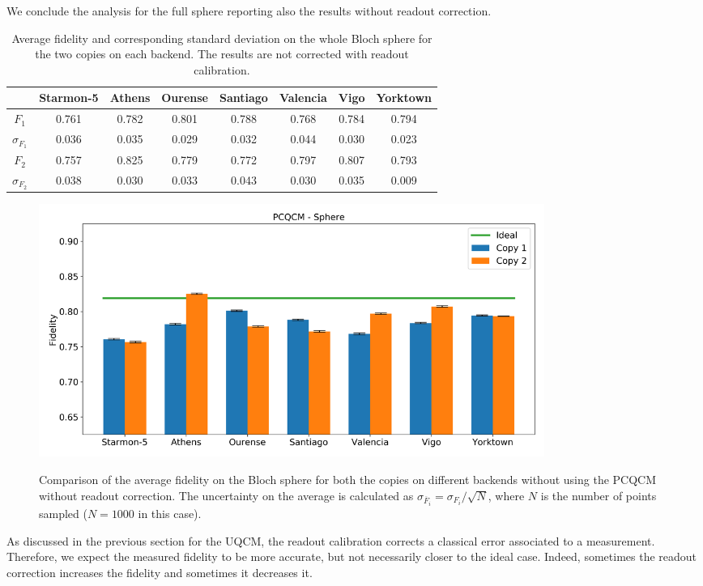 We conclude the analysis for the full sphere reporting also the results without readout correction.
\begin{table}[H]
    \centering
    \begin{tabular}{|c|c|c|c|c|c|c|c|}
    \hline
    \textbf{} & \textbf{Starmon-5} & \textbf{Athens} & \textbf{Ourense} & \textbf{Santiago} & \textbf{Valencia} & \textbf{Vigo} & \textbf{Yorktown} \\ \hline
    $F_1$              & 0.761 & 0.782 & 0.801 & 0.788 & 0.768 & 0.784 & 0.794 \\ \hline
    $\sigma_{F_1}$     & 0.036 & 0.035 & 0.029 & 0.032 & 0.044 & 0.030 & 0.023 \\ \hline
    $F_2$              & 0.757 & 0.825 & 0.779 & 0.772 & 0.797 & 0.807 & 0.793 \\ \hline
    $\sigma_{F_2}$     & 0.038 & 0.030 & 0.033 & 0.043 & 0.030 & 0.035 & 0.009 \\ \hline
    \end{tabular}
    \caption{Average fidelity and corresponding standard deviation on the whole Bloch sphere for the two copies on each backend. The results are not corrected with readout calibration.}
    \label{tab:results_pcqcm_fullsphere_not_corrected}
\end{table}
\begin{figure}[H]
  \centering
          \includegraphics[width=0.8\textwidth]{Figures/PhaseCovariant/Histograms/histo_sphere.png}
      \label{fig:pc_histo_sphere_not_corrected}
      \caption{Comparison of the average fidelity on the Bloch sphere for both the copies on different backends without using the PCQCM without readout correction. The uncertainty on the average is calculated as $\sigma_{\overline{F}_i}=\sigma_{F_i}/\sqrt{N}$, where $N$ is the number of points sampled ($N=1000$ in this case).}
\end{figure}
As discussed in the previous section for the UQCM, the readout calibration corrects a classical error associated to a measurement.
Therefore, we expect the measured fidelity to be more accurate, but not necessarily closer to the ideal case. 
Indeed, sometimes the readout correction increases the fidelity and sometimes it decreases it.

